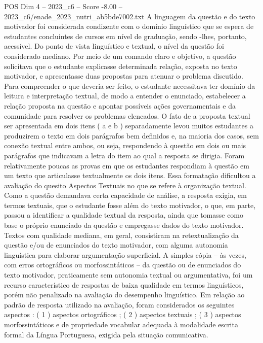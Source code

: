 \begin{textsample}{POS Dim 4 – 2023\_c6 – Score -8.00 – 2023\_c6/enade\_2023\_nutri\_ab5bde7002.txt}
A linguagem da questão e do texto motivador foi considerada condizente com o domínio linguístico que se espera de estudantes concluintes de cursos em nível de graduação, sendo -lhes, portanto, acessível.
Do ponto de vista linguístico e textual, o nível da questão foi considerado mediano.
Por meio de um comando claro e objetivo, a questão solicitava que o estudante explicasse determinada relação, exposta no texto motivador, e apresentasse duas propostas para atenuar o problema discutido.
Para compreender o que deveria ser feito, o estudante necessitava ter domínio da leitura e interpretação textual, de modo a entender o enunciado, estabelecer a relação proposta na questão e apontar possíveis ações governamentais e da comunidade para resolver os problemas elencados.
O fato de a proposta textual ser apresentada em dois itens ( a e b ) separadamente levou muitos estudantes a produzirem o texto em dois parágrafos bem definidos e, na maioria dos casos, sem conexão textual entre ambos, ou seja, respondendo à questão em dois ou mais parágrafos que indicavam a letra do item ao qual a resposta se dirigia.
Foram relativamente poucas as provas em que os estudantes respondiam à questão em um texto que articulasse textualmente os dois itens.
Essa formatação dificultou a avaliação do quesito Aspectos Textuais no que se refere à organização textual.
Como a questão demandava certa capacidade de análise, a resposta exigia, em termos textuais, que o estudante fosse além do texto motivador, o que, em parte, passou a identificar a qualidade textual da resposta, ainda que tomasse como base o próprio enunciado da questão e empregasse dados do texto motivador.
Textos com qualidade mediana, em geral, consistiram na retextualização da questão e/ou de enunciados do texto motivador, com alguma autonomia linguística para elaborar argumentação superficial.
A simples cópia – às vezes, com erros ortográficos ou morfossintáticos – da questão ou de enunciados do texto motivador, praticamente sem autonomia textual ou argumentativa, foi um recurso característico de respostas de baixa qualidade em termos linguísticos, porém não penalizado na avaliação do desempenho linguístico.
Em relação ao padrão de resposta utilizado na avaliação, foram considerados os seguintes aspectos : ( 1 ) aspectos ortográficos ; ( 2 ) aspectos textuais ; ( 3 ) aspectos morfossintáticos e de propriedade vocabular adequada à modalidade escrita formal da Língua Portuguesa, exigida pela situação comunicativa.

\end{textsample}
